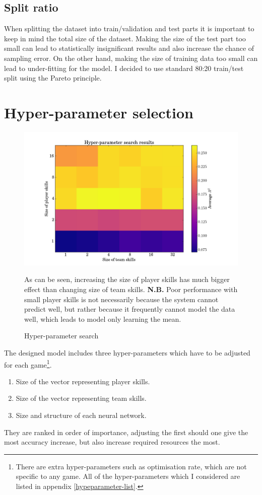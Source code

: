 \documentclass[12pt,a4paper]{book}
\newcommand\note[1]{\vspace*{-0.5\baselineskip}\caption*{#1}}
\begin{document}
\subsection{Split ratio}
When splitting the dataset into train/validation and test parts it is important to keep in mind the total size of the dataset.
Making the size of the test part too small can lead to statistically insignificant results and also increase the chance of sampling error.
On the other hand, making the size of training data too small can lead to under-fitting for the model.
I decided to use standard 80:20 train/test split using the Pareto principle.

\section{Hyper-parameter selection}
\begin{figure}[ht]
\centering
\includegraphics[scale=0.5]{hyper-parameter-search}
\caption{Hyper-parameter search}
\note{As can be seen, increasing the size of player skills has much bigger effect than changing size of team skills.
\textbf{N.B.} Poor performance with small player skills is not necessarily because the system cannot predict well, but rather because it frequently cannot model the data well, which leads to model only learning the mean.
}
\label{fig:hyper-parameter-search}
\end{figure}
The designed model includes three hyper-parameters which have to be adjusted for each game\footnote{There are extra hyper-parameters such as optimisation rate, which are not specific to any game. 
All of the hyper-parameters which I considered are listed in appendix  \ref{hypeparameter-list}.}.
\begin{enumerate}
\item Size of the vector representing player skills.
\item Size of the vector representing team skills.
\item Size and structure of each neural network.
\end{enumerate}
They are ranked in order of importance, adjusting the first should one give the most accuracy increase, but also increase required resources the most.
\end{document}
